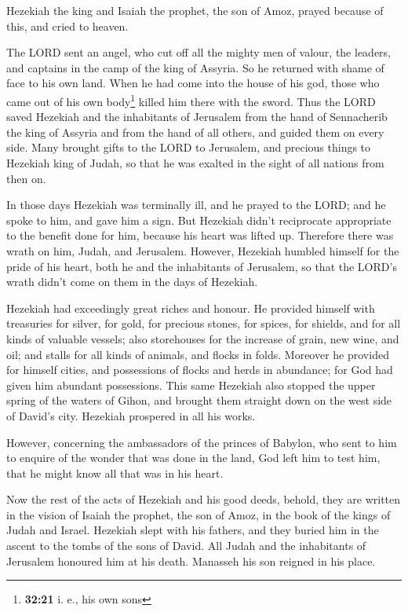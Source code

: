  Hezekiah the king and Isaiah the prophet, the son of
Amoz, prayed because of this, and cried to heaven.

 The LORD sent an angel, who cut off all the mighty men
of valour, the leaders, and captains in the camp of the king of Assyria.
So he returned with shame of face to his own land. When he had come into
the house of his god, those who came out of his own body\footnote{\textbf{32:21}
  i. e., his own sons} killed him there with the sword. 
Thus the LORD saved Hezekiah and the inhabitants of Jerusalem from the
hand of Sennacherib the king of Assyria and from the hand of all others,
and guided them on every side.  Many brought gifts to the
LORD to Jerusalem, and precious things to Hezekiah king of Judah, so
that he was exalted in the sight of all nations from then on.

 In those days Hezekiah was terminally ill, and he prayed
to the LORD; and he spoke to him, and gave him a sign. 
But Hezekiah didn't reciprocate appropriate to the benefit done for him,
because his heart was lifted up. Therefore there was wrath on him,
Judah, and Jerusalem.  However, Hezekiah humbled himself
for the pride of his heart, both he and the inhabitants of Jerusalem, so
that the LORD's wrath didn't come on them in the days of Hezekiah.

 Hezekiah had exceedingly great riches and honour. He
provided himself with treasuries for silver, for gold, for precious
stones, for spices, for shields, and for all kinds of valuable vessels;
 also storehouses for the increase of grain, new wine,
and oil; and stalls for all kinds of animals, and flocks in folds.
 Moreover he provided for himself cities, and possessions
of flocks and herds in abundance; for God had given him abundant
possessions.  This same Hezekiah also stopped the upper
spring of the waters of Gihon, and brought them straight down on the
west side of David's city. Hezekiah prospered in all his works.

 However, concerning the ambassadors of the princes of
Babylon, who sent to him to enquire of the wonder that was done in the
land, God left him to test him, that he might know all that was in his
heart.

 Now the rest of the acts of Hezekiah and his good deeds,
behold, they are written in the vision of Isaiah the prophet, the son of
Amoz, in the book of the kings of Judah and Israel. 
Hezekiah slept with his fathers, and they buried him in the ascent to
the tombs of the sons of David. All Judah and the inhabitants of
Jerusalem honoured him at his death. Manasseh his son reigned in his
place.

